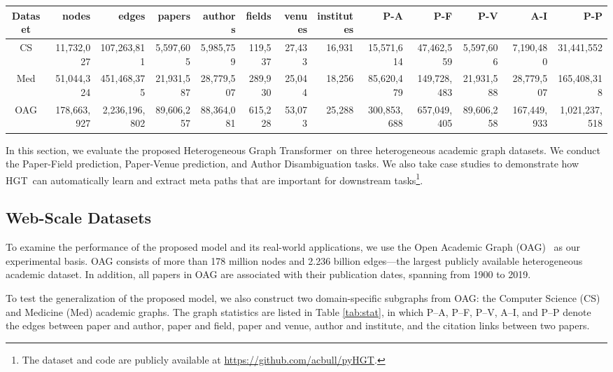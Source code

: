 \documentclass[sigconf]{acmart}
\theoremstyle{definition}
\newcommand{\model}{Heterogeneous Graph Transformer}
\newcommand{\short}{HGT}
\begin{document}
\begin{table*}[th]
\centering
\footnotesize
\begin{tabular}{c|rr|rrrrr|rrrrr} 
\toprule
Dataset & nodes & edges & papers & authors & fields & venues & institutes & P-A & P-F & P-V & A-I & P-P \\ 
\midrule
CS & 11,732,027 & 107,263,811 & 5,597,605 & 5,985,759 &  119,537&  27,433 & 16,931   & 15,571,614 & 47,462,559 & 5,597,606 & 7,190,480 & 31,441,552\\ 
\midrule
Med & 51,044,324 & 451,468,375 & 21,931,587 & 28,779,507&  289,930 &  25,044&  18,256  &85,620,479 & 149,728,483&21,931,588 & 28,779,507& 165,408,318\\ 
\midrule
OAG & 178,663,927 & 2,236,196,802  & 89,606,257 & 88,364,081 &  615,228&  53,073&  25,288 & 300,853,688&  657,049,405&  89,606,258&  167,449,933 & 1,021,237,518\\
\bottomrule
\end{tabular}
\caption{Open Academic Graph (OAG) Statistics.} 
\label{tab:stat} 
\end{table*}








In this section, we evaluate the proposed \model\ on three heterogeneous academic graph datasets. 
We conduct the Paper-Field prediction, Paper-Venue prediction, and Author Disambiguation tasks. 
We also take case studies to demonstrate how \short\ can automatically learn and extract meta paths that are important for downstream tasks\footnote{The dataset and code are publicly available at \url{https://github.com/acbull/pyHGT}.}. 


\subsection{Web-Scale Datasets}

To examine the performance of the proposed model and its real-world applications, we use the Open Academic Graph (OAG)~\cite{DBLP:conf/www/SinhaSSMEHW15,tang2008arnetminer,DBLP:conf/kdd/ZhangLTDYZGWSLW19} as our experimental basis. 
OAG consists of more than 178 million nodes and 2.236 billion edges---the largest publicly available heterogeneous academic dataset. 
In addition, all papers in OAG are associated with their publication dates, spanning from 1900 to 2019. 

To test the generalization of the proposed model, we also construct two domain-specific subgraphs from OAG: the Computer Science (CS) and Medicine (Med) academic graphs. 
The graph statistics are listed in Table \ref{tab:stat}, in which P--A, P--F, P--V, A--I, and P--P denote the edges between paper and author, paper and field, paper and venue, author and institute, and the citation links between two papers. 
\end{document}
